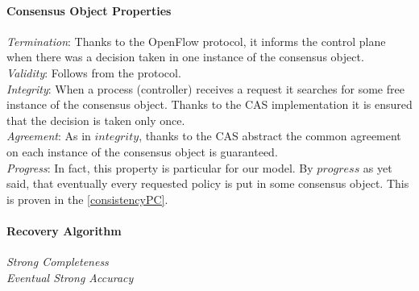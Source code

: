 \documentclass{article}
\theoremstyle{remark}
\begin{document}
\paragraph{Consensus Object Properties}
\emph{Termination}: Thanks to the OpenFlow protocol, it informs the control plane when there was a decision taken in one instance of the consensus object. 
\\
\emph{Validity}: Follows from the protocol.
\\
\emph{Integrity}: When a process (controller) receives a request it searches for some free instance of the consensus object. Thanks to the CAS implementation it is ensured that the decision is taken only once.
\\
\emph{Agreement}: As in $integrity$, thanks to the CAS abstract the common agreement on each instance of the consensus object is guaranteed.
\\
\emph{Progress}: In fact, this property is particular for our model. By $progress$ as yet said, that eventually every requested policy is put in some consensus object. This is proven in the \ref{consistencyPC}.
\paragraph{Recovery Algorithm}
\emph{Strong Completeness}
\\
\emph{Eventual Strong Accuracy}
\end{document}
